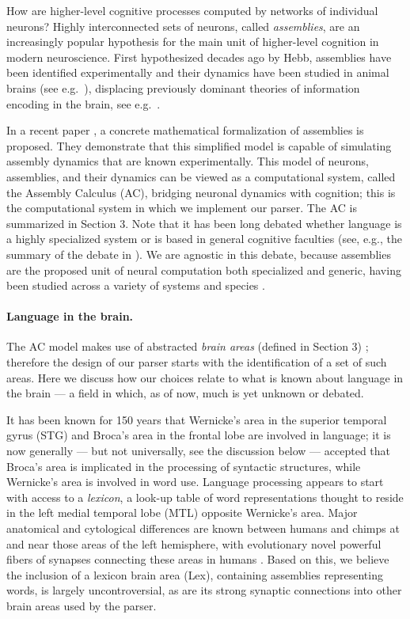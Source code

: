 \documentclass[11pt,a4paper]{article}
\begin{document}
How are higher-level cognitive processes computed by networks of individual neurons? Highly interconnected sets of neurons, called {\em assemblies}, are an increasingly popular hypothesis for the main unit of higher-level cognition in modern neuroscience. First hypothesized decades ago by Hebb, assemblies have been identified experimentally \cite{Harris} and their dynamics have been studied in animal brains (see e.g.~\citet{MillerETAL:14}), displacing previously dominant theories of information encoding in the brain, see e.g.~\citet{Eichenbaum}. 

In a recent paper \cite{PNAS}, a concrete mathematical formalization of assemblies is proposed.  They demonstrate that this simplified model is capable of simulating assembly dynamics that are known experimentally. This model of neurons, assemblies, and their dynamics can be viewed as a computational system, called the Assembly Calculus (AC), bridging neuronal dynamics with cognition; this is the computational system in which we implement our parser. The AC is summarized in Section 3. Note that it has been long debated whether language is a highly specialized system or is based in general cognitive faculties (see, e.g., the summary of the debate in \citet{VasisthLewis}). We are agnostic in this debate, because assemblies are the proposed unit of neural computation both specialized and generic, having been studied across a variety of systems and species \cite{MillerETAL:14,carrillo2018triggering}.

\paragraph{Language in the brain.}  
The AC model makes use of abstracted {\em brain areas} (defined in Section 3)%
; therefore the design of our parser starts with the identification of a set of such areas.  Here we discuss how our choices relate to what is known about language in the brain --- a field in which, as of now, much is yet unknown or debated.

It has been known for 150 years that Wernicke's area in the superior temporal gyrus (STG) and Broca's area in the frontal lobe are involved in language; it is now generally --- but not universally, see the discussion below --- accepted that Broca's area is implicated in the processing of syntactic structures, while Wernicke's area is involved in word use. Language processing appears to start with access to a {\em lexicon}, a look-up table of word representations thought to reside in the left medial temporal lobe (MTL) opposite Wernicke's area. Major anatomical and cytological differences are known between humans and chimps at and near those areas of the left hemisphere, with evolutionary novel powerful fibers of synapses connecting these areas in humans \cite{Schomers}. Based on this, we believe the inclusion of a lexicon brain area ({\sc Lex}), containing assemblies representing words, is largely uncontroversial, as are its strong synaptic connections into other brain areas used by the parser. 
\end{document}
